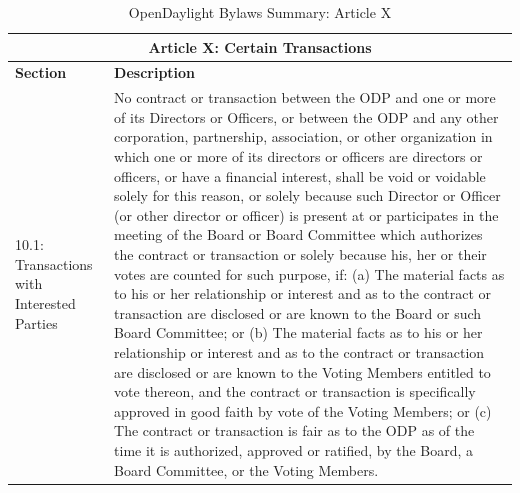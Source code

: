 \documentclass[a4paper, 12pt]{book}
\begin{document}
{\begin{table}[H]
  \begin{center}
    \begin{tabular}{ | p{4cm} | p{11cm} | }
    \toprule
    \multicolumn {2}{|c|}{\textbf{Article X: Certain Transactions}} \\
    \hline
    \textbf{Section} & \textbf{Description} \\
    \hline
    10.1: Transactions with Interested Parties & No contract or transaction between the ODP and one or more of its Directors or Officers, or between the ODP and any other corporation, partnership, association, or other organization in which one or more of its directors or officers are directors or officers, or have a financial interest, shall be void or voidable solely for this reason, or solely because such Director or Officer (or other director or officer) is present at or participates in the meeting of the Board or Board Committee which authorizes the contract or transaction or solely because his, her or their votes are counted for such purpose, if: (a) The material facts as to his or her relationship or interest and as to the contract or transaction are disclosed or are known to the Board or such Board Committee; or (b) The material facts as to his or her relationship or interest and as to the contract or transaction are disclosed or are known to the Voting Members entitled to vote thereon, and the contract or transaction is specifically approved in good faith by vote of the Voting Members; or (c)  The contract or transaction is fair as to the ODP as of the time it is authorized, approved or ratified, by the Board, a Board Committee, or the Voting Members.\\
    \bottomrule
    \end{tabular}
    \caption{OpenDaylight Bylaws Summary: Article X}
    \label{tab:odlbylaws-art10}
  \end{center}
\end{table}

}
\end{document}

